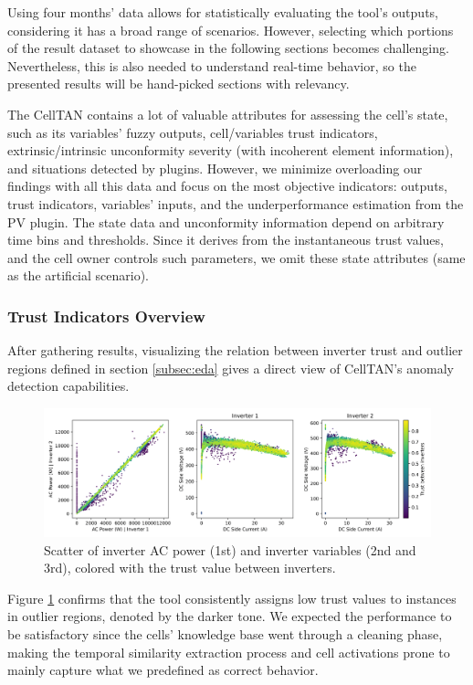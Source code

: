 Using four months' data allows for statistically evaluating the tool's outputs, considering it has a broad range of scenarios. However, selecting which portions of the result dataset to showcase in the following sections becomes challenging. Nevertheless, this is also needed to understand real-time behavior, so the presented results will be hand-picked sections with relevancy.

The CellTAN contains a lot of valuable attributes for assessing the cell's state, such as its variables' fuzzy outputs, cell/variables trust indicators, extrinsic/intrinsic unconformity severity (with incoherent element information), and situations detected by plugins. However, we minimize overloading our findings with all this data and focus on the most objective indicators: outputs, trust indicators, variables' inputs, and the underperformance estimation from the PV plugin. The state data and unconformity information depend on arbitrary time bins and thresholds. Since it derives from the instantaneous trust values, and the cell owner controls such parameters, we omit these state attributes (same as the artificial scenario).

\subsubsection{Trust Indicators Overview}

After gathering results, visualizing the relation between inverter trust and outlier regions defined in section \ref{subsec:eda} gives a direct view of CellTAN's anomaly detection capabilities.

\begin{figure}[h!]
    \centering
    \includegraphics[width=\textwidth]{figures/chapter5/results/real/52_scatter_with_trust-1.png}
    \caption{Scatter of inverter AC power (1st) and inverter variables (2nd and 3rd), colored with the trust value between inverters.}
    \label{fig:real_sim_trust_scatter}
\end{figure}

Figure \ref{fig:real_sim_trust_scatter} confirms that the tool consistently assigns low trust values to instances in outlier regions, denoted by the darker tone. We expected the performance to be satisfactory since the cells' knowledge base went through a cleaning phase, making the temporal similarity extraction process and cell activations prone to mainly capture what we predefined as correct behavior.

